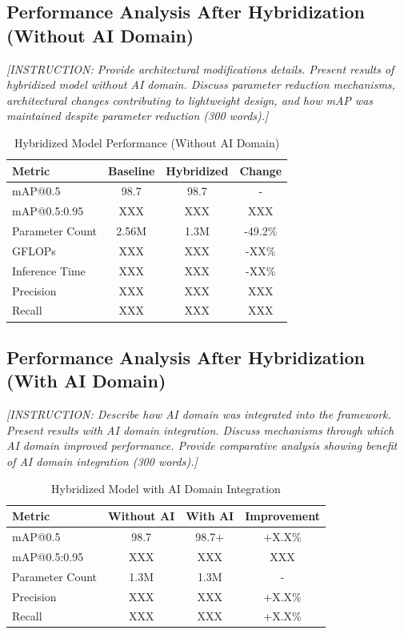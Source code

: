 \documentclass[11pt,a4paper]{article}
\begin{document}
\subsection{Performance Analysis After Hybridization (Without AI Domain)}

\label{subsec:hybrid_without_ai}

\textit{[INSTRUCTION: Provide architectural modifications details. Present results of hybridized model 
without AI domain. Discuss parameter reduction mechanisms, architectural changes contributing to 
lightweight design, and how mAP was maintained despite parameter reduction (300 words).]}

\begin{table}[H]
    \centering
    \caption{Hybridized Model Performance (Without AI Domain)}
    \label{tab:hybrid_no_ai}
    \begin{tabular}{|l|c|c|c|}
    \hline
    \textbf{Metric} & \textbf{Baseline} & \textbf{Hybridized} & \textbf{Change} \\
    \hline
    mAP@0.5 & 98.7 & 98.7 & - \\
    mAP@0.5:0.95 & XXX & XXX & XXX \\
    Parameter Count & 2.56M & 1.3M & -49.2\% \\
    GFLOPs & XXX & XXX & -XX\% \\
    Inference Time & XXX & XXX & -XX\% \\
    Precision & XXX & XXX & XXX \\
    Recall & XXX & XXX & XXX \\
    \hline
    \end{tabular}
\end{table}

\subsection{Performance Analysis After Hybridization (With AI Domain)}

\label{subsec:hybrid_with_ai}

\textit{[INSTRUCTION: Describe how AI domain was integrated into the framework. Present results with 
AI domain integration. Discuss mechanisms through which AI domain improved performance. Provide 
comparative analysis showing benefit of AI domain integration (300 words).]}

\begin{table}[H]
    \centering
    \caption{Hybridized Model with AI Domain Integration}
    \label{tab:hybrid_with_ai}
    \begin{tabular}{|l|c|c|c|}
    \hline
    \textbf{Metric} & \textbf{Without AI} & \textbf{With AI} & \textbf{Improvement} \\
    \hline
    mAP@0.5 & 98.7 & 98.7+ & +X.X\% \\
    mAP@0.5:0.95 & XXX & XXX & XXX \\
    Parameter Count & 1.3M & 1.3M & - \\
    Precision & XXX & XXX & +X.X\% \\
    Recall & XXX & XXX & +X.X\% \\
    \hline
    \end{tabular}
\end{table}
\end{document}
